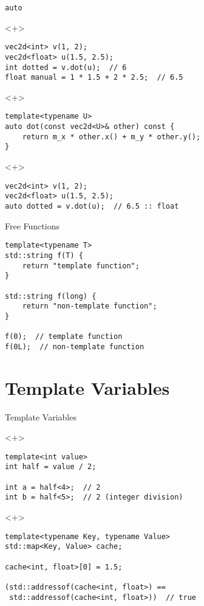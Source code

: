 \documentclass[table]{beamer}
\begin{document}
\begin{frame}[fragile]{\texttt{auto}}
  \begin{onlyenv}<+>
    \begin{verbatim}
vec2d<int> v(1, 2);
vec2d<float> u(1.5, 2.5);
int dotted = v.dot(u);  // 6
float manual = 1 * 1.5 + 2 * 2.5;  // 6.5
    \end{verbatim}
  \end{onlyenv}

  \begin{onlyenv}<+>
    \begin{verbatim}
template<typename U>
auto dot(const vec2d<U>& other) const {
    return m_x * other.x() + m_y * other.y();
}
    \end{verbatim}
  \end{onlyenv}

  \begin{onlyenv}<+>
    \begin{verbatim}
vec2d<int> v(1, 2);
vec2d<float> u(1.5, 2.5);
auto dotted = v.dot(u);  // 6.5 :: float
    \end{verbatim}
  \end{onlyenv}
\end{frame}

\begin{frame}[fragile]{Free Functions}
  \begin{verbatim}
template<typename T>
std::string f(T) {
    return "template function";
}

std::string f(long) {
    return "non-template function";
}

f(0);  // template function
f(0L);  // non-template function
  \end{verbatim}
\end{frame}

\section{Template Variables}

\begin{frame}[fragile]{Template Variables}
  \begin{onlyenv}<+>
    \begin{verbatim}
template<int value>
int half = value / 2;

int a = half<4>;  // 2
int b = half<5>;  // 2 (integer division)
    \end{verbatim}
  \end{onlyenv}

  \begin{onlyenv}<+>
    \begin{verbatim}
template<typename Key, typename Value>
std::map<Key, Value> cache;

cache<int, float>[0] = 1.5;

(std::addressof(cache<int, float>) ==
 std::addressof(cache<int, float>))  // true
    \end{verbatim}
  \end{onlyenv}
\end{frame}
\end{document}
